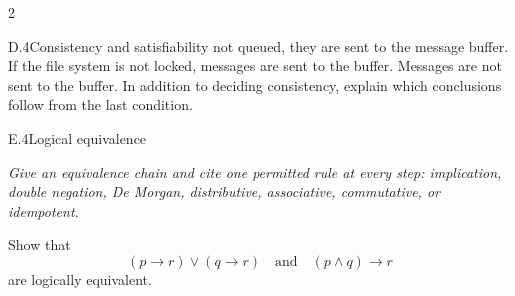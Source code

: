 \documentclass[9pt]{extarticle}
\begin{document}
\begin{multicols}{2}
\begin{CoreProblem}{D.4}{Consistency and satisfiability}
not queued, they are sent to the message buffer. If the file system is not
locked, messages are sent to the buffer. Messages are not sent to the buffer.
In addition to deciding consistency, explain which conclusions follow from the
last condition.
\end{CoreProblem}
\begin{CoreProblem}{E.4}{Logical equivalence}
{\scriptsize\textit{Give an equivalence chain and cite one permitted rule at every step: implication, double negation, De Morgan, distributive, associative, commutative, or idempotent.}\par}
Show that
\[
  (p\to r)\lor(q\to r)
  \quad\text{and}\quad
  (p\land q)\to r
\]
are logically equivalent.
\end{CoreProblem}
\end{multicols}
\CoreWorkArea
\FormBreak
{}
\end{document}
